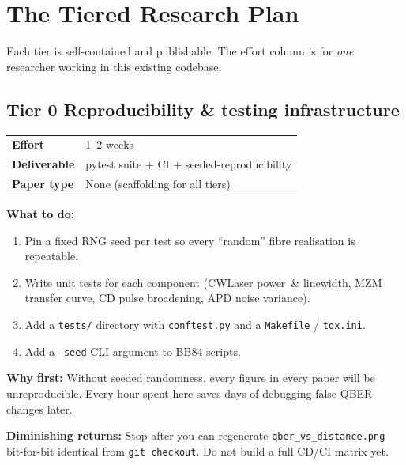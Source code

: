 \documentclass[11pt,a4paper]{article}
\begin{document}
\newpage
\section{The Tiered Research Plan}

Each tier is self-contained and publishable.  The effort column is for \emph{one} researcher
working in this existing codebase.

\bigskip

\subsection*{\color{tier1}Tier 0 \hfill Reproducibility \& testing infrastructure}

\begin{tabular}{ll}
\toprule
\textbf{Effort} & 1--2 weeks \\
\textbf{Deliverable} & pytest suite + CI + seeded-reproducibility \\
\textbf{Paper type} & None (scaffolding for all tiers) \\
\bottomrule
\end{tabular}

\vspace{4pt}
\noindent\textbf{What to do:}
\begin{enumerate}[nosep]
    \item Pin a fixed RNG seed per test so every ``random'' fibre realisation is repeatable.
    \item Write unit tests for each component (CWLaser power~\& linewidth, MZM transfer curve, CD pulse broadening, APD noise variance).
    \item Add a \texttt{tests/} directory with \texttt{conftest.py} and a \texttt{Makefile} / \texttt{tox.ini}.
    \item Add a \texttt{--seed} CLI argument to BB84 scripts.
\end{enumerate}
\noindent\textbf{Why first:} Without seeded randomness, every figure in every paper will be unreproducible.
Every hour spent here saves days of debugging false QBER changes later.

\vspace{4pt}
\noindent\textbf{Diminishing returns:} Stop after you can regenerate \texttt{qber\_vs\_distance.png}
bit-for-bit identical from \texttt{git checkout}.  Do not build a full CD/CI matrix yet.

\newpage
\end{document}

